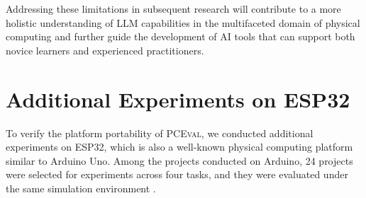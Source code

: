 \documentclass{article} %
\begin{document}
Addressing these limitations in subsequent research will contribute to a more holistic understanding of LLM capabilities in the multifaceted domain of physical computing and further guide the development of AI tools that can support both novice learners and experienced practitioners.

\section{Additional Experiments on ESP32}
\label{Appendix:AddESP32}

To verify the platform portability of \textsc{PCEval}, we conducted additional experiments on ESP32, which is also a well-known physical computing platform similar to Arduino Uno. Among the projects conducted on Arduino, 24 projects were selected for experiments across four tasks, and they were evaluated under the same simulation environment \citep{shaked2020wokwi}.
\end{document}
